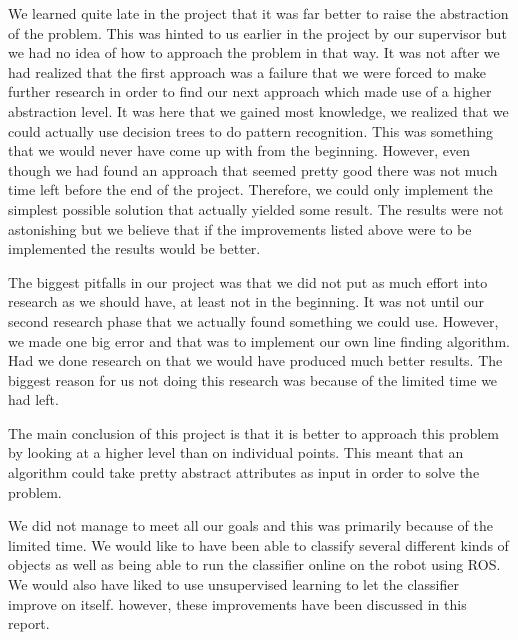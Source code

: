 \documentclass[a4paper, 10pt, conference]{ieeeconf}      %
\begin{document}
We learned quite late in the project that it was far better to raise the abstraction of the problem. This was hinted to us earlier in the project by our supervisor but we had no idea of how to approach the problem in that way. It was not after we had realized that the first approach was a failure that we were forced to make further research in order to find our next approach which made use of a higher abstraction level. It was here that we gained most knowledge, we realized that we could actually use decision trees to do pattern recognition. This was something that we would never have come up with from the beginning. However, even though we had found an approach that seemed pretty good there was not much time left before the end of the project. Therefore, we could only implement the simplest possible solution that actually yielded some result. The results were not astonishing but we believe that if the improvements listed above were to be implemented the results would be better.

The biggest pitfalls in our project was that we did not put as much effort into research as we should have, at least not in the beginning. It was not until our second research phase that we actually found something we could use. However, we made one big error and that was to implement our own line finding algorithm. Had we done research on that we would have produced much better results. The biggest reason for us not doing this research was because of the limited time we had left.

The main conclusion of this project is that it is better to approach this problem by looking at a higher level than on individual points. This meant that an algorithm could take pretty abstract attributes as input in order to solve the problem.

We did not manage to meet all our goals and this was primarily because of the limited time. We would like to have been able to classify several different kinds of objects as well as being able to run the classifier online on the robot using ROS. We would also have liked to use unsupervised learning to let the classifier improve on itself. however, these improvements have been discussed in this report.







\end{document}
